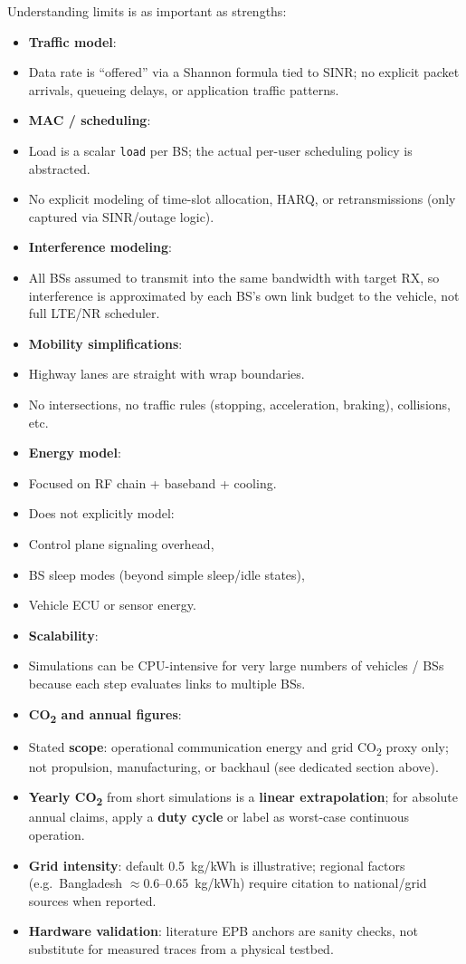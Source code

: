 \documentclass[conference]{IEEEtran}
\begin{document}
Understanding limits is as important as strengths:
\begin{itemize}
\item \textbf{Traffic model}:
\item Data rate is “offered” via a Shannon formula tied to SINR; no explicit packet arrivals, queueing delays, or application traffic patterns.
\item \textbf{MAC / scheduling}:
\item Load is a scalar \texttt{load} per BS; the actual per-user scheduling policy is abstracted.
\item No explicit modeling of time-slot allocation, HARQ, or retransmissions (only captured via SINR/outage logic).
\item \textbf{Interference modeling}:
\item All BSs assumed to transmit into the same bandwidth with target RX, so interference is approximated by each BS’s own link budget to the vehicle, not full LTE/NR scheduler.
\item \textbf{Mobility simplifications}:
\item Highway lanes are straight with wrap boundaries.
\item No intersections, no traffic rules (stopping, acceleration, braking), collisions, etc.
\item \textbf{Energy model}:
\item Focused on RF chain + baseband + cooling.
\item Does not explicitly model:
\item Control plane signaling overhead,
\item BS sleep modes (beyond simple sleep/idle states),
\item Vehicle ECU or sensor energy.
\item \textbf{Scalability}:
\item Simulations can be CPU-intensive for very large numbers of vehicles / BSs because each step evaluates links to multiple BSs.
\item \textbf{CO\textsubscript{2} and annual figures}:
\item Stated \textbf{scope}: operational communication energy and grid CO\textsubscript{2} proxy only; not propulsion, manufacturing, or backhaul (see dedicated section above).
\item \textbf{Yearly CO\textsubscript{2}} from short simulations is a \textbf{linear extrapolation}; for absolute annual claims, apply a \textbf{duty cycle} or label as worst-case continuous operation.
\item \textbf{Grid intensity}: default 0.5~kg/kWh is illustrative; regional factors (e.g.\ Bangladesh $\approx$0.6--0.65~kg/kWh) require citation to national/grid sources when reported.
\item \textbf{Hardware validation}: literature EPB anchors are sanity checks, not substitute for measured traces from a physical testbed.
\end{itemize}
\end{document}
